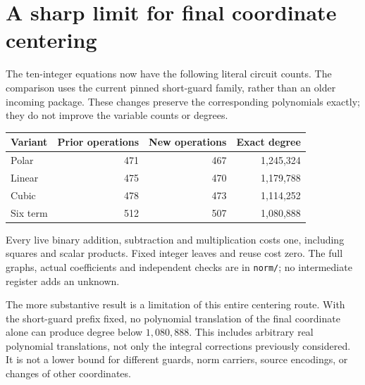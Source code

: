 \section{A sharp limit for final coordinate centering}
The ten-integer equations now have the following literal circuit counts.
The comparison uses the current pinned short-guard family, rather than an
older incoming package. These changes preserve the corresponding
polynomials exactly; they do not improve the variable counts or degrees.
\begin{center}
\begin{tabular}{lrrr}
Variant & Prior operations & New operations & Exact degree\\\hline
Polar &471&467&1,245,324\\
Linear &475&470&1,179,788\\
Cubic &478&473&1,114,252\\
Six term &512&507&1,080,888
\end{tabular}
\end{center}
Every live binary addition, subtraction and multiplication costs one,
including squares and scalar products. Fixed integer leaves and reuse cost
zero. The full graphs, actual coefficients and independent checks are in
\texttt{norm/}; no intermediate register adds an unknown.

The more substantive result is a limitation of this entire centering route.
With the short-guard prefix fixed, no polynomial translation of the final
coordinate alone can produce degree below $1{,}080{,}888$. This includes
arbitrary real polynomial translations, not only the integral corrections
previously considered. It is not a lower bound for different guards, norm
carriers, source encodings, or changes of other coordinates.

